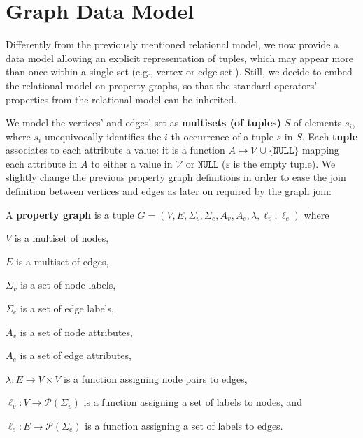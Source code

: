 

\section{Graph Data Model}\label{sec:datamodel}
Differently from the previously mentioned relational model, we now provide a data model allowing an explicit representation of tuples, which may appear more than once within a single set (e.g., vertex or edge set.). Still, we decide to embed the relational model on property graphs, so that the standard operators' properties from the relational model can be inherited.

We  model the
vertices' and edges' set 
as \textbf{multisets (of tuples)} $S$ of elements $s_i$, where  $s_i$ unequivocally identifies the $i$-th 
occurrence of a tuple $s$ in $S$. Each \textbf{tuple} associates to each attribute a value:
it is a function $A\mapsto\mathcal{V}\cup\{\texttt{NULL}\}$ mapping each attribute in $A$ to  
either a  value in $\mathcal{V}$ or $\texttt{NULL}$ ($\varepsilon$ is the empty tuple).
We slightly change the previous property graph definitions in order to
ease the join definition between vertices and edges as later on required by the graph join:

\begin{definition}\label{def:pg}
	A \textbf{property graph} is a tuple $G=(V,E,\Sigma_v,\Sigma_e,A_v,A_e,\lambda,\ell_v,\ell_e)$ 
	where \begin{alphalist}
		\item $V$ is a multiset of nodes,
		\item $E$ is a multiset of edges,
		\item $\Sigma_v$ is a set of node labels,
		\item $\Sigma_e$ is a set of edge labels,
		\item $A_v$ is a set of node attributes,
		\item $A_e$ is a set of edge attributes,
		\item $\lambda\colon E\to V\times V$ is a function assigning node pairs to edges,
		\item $\ell_v\colon V\to \mathcal{P}(\Sigma_v)$ is a function assigning a set of labels to nodes, and 
		\item $\ell_e\colon E\to \mathcal{P}(\Sigma_e)$ is a function assigning a set of labels to edges.
	\end{alphalist}
\end{definition} 

